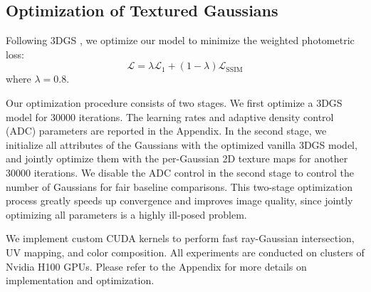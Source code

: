 \subsection{Optimization of Textured Gaussians}
Following 3DGS \cite{kerbl3Dgaussians}, we optimize our model to minimize the weighted photometric loss:
\begin{equation}
    \mathcal{L} = \lambda \mathcal{L}_1 + (1 - \lambda) \mathcal{L}_\text{SSIM}
\end{equation}
where $\lambda = 0.8$. 

Our optimization procedure consists of two stages. We first optimize a 3DGS model for 30000 iterations. The learning rates and adaptive density control (ADC) parameters are reported in the Appendix. In the second stage, we initialize all attributes of the Gaussians with the optimized vanilla 3DGS model, and jointly optimize them with the per-Gaussian 2D texture maps for another 30000 iterations. We disable the ADC control in the second stage to control the number of Gaussians for fair baseline comparisons. This two-stage optimization process greatly speeds up convergence and improves image quality, since jointly optimizing all parameters is a highly ill-posed problem.

We implement custom CUDA kernels to perform fast ray-Gaussian intersection, UV mapping, and color composition. All experiments are conducted on clusters of Nvidia H100 GPUs. Please refer to the Appendix for more details on implementation and optimization.


